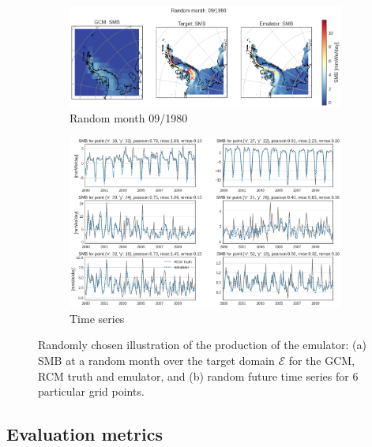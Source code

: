\documentclass[a4paper,11pt,oneside]{report}
\begin{document}
\begin{figure}[tbp]
        \centering
        \begin{subfigure}[b]{0.8\columnwidth}
            \centering \includegraphics[width=\textwidth]{images/random_month_RCM.png}
            \caption[]%
            {{\small Random month 09/1980}}    
          \label{fig:rdpoints-RCM}
        \end{subfigure}
        \hfill
        \begin{subfigure}[b]{\columnwidth}  
            \centering 
            \includegraphics[width=\textwidth]{images/timeseries_RCM.png}
            \caption[]%
            {{\small Time series}}  
            \label{fig:timeseries-RCM}
        \end{subfigure}
        \hfill
        \caption[]
        {\small Randomly chosen illustration of the production of the emulator: (a) SMB at a random month over the target domain $\mathcal{E}$ for the GCM, RCM truth and emulator, and (b) random future time series for 6 particular grid points.} 
        \label{fig:points-timeseries-RCM}
    \end{figure}


\subsection{Evaluation metrics}
\end{document}

